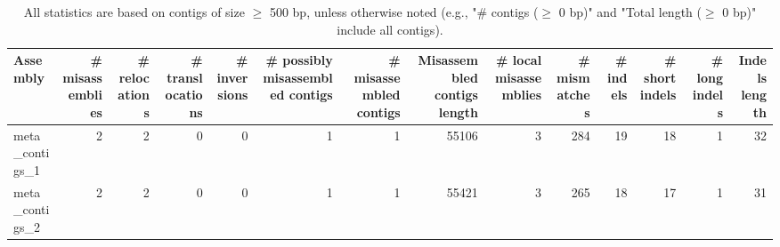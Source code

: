 \documentclass[12pt,a4paper]{article}
\begin{document}
\begin{table}[ht]
\begin{center}
\caption{All statistics are based on contigs of size $\geq$ 500 bp, unless otherwise noted (e.g., "\# contigs ($\geq$ 0 bp)" and "Total length ($\geq$ 0 bp)" include all contigs).}
\begin{tabular}{|l*{13}{|r}|}
\hline
Assembly & \# misassemblies &     \# relocations &     \# translocations &     \# inversions & \# possibly misassembled contigs & \# misassembled contigs & Misassembled contigs length & \# local misassemblies & \# mismatches & \# indels &     \# short indels &     \# long indels & Indels length \\ \hline
meta\_contigs\_1 & 2 & 2 & 0 & 0 & 1 & 1 & 55106 & 3 & 284 & 19 & 18 & 1 & 32 \\ \hline
meta\_contigs\_2 & 2 & 2 & 0 & 0 & 1 & 1 & 55421 & 3 & 265 & 18 & 17 & 1 & 31 \\ \hline
\end{tabular}
\end{center}
\end{table}
\end{document}
